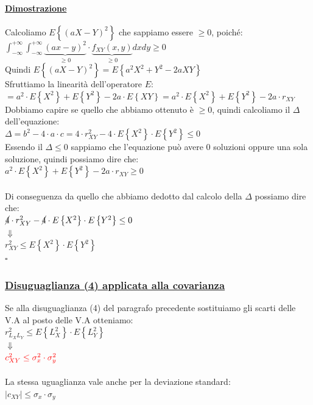 \documentclass{article}
\begin{document}
\begin{enumerate}
    \paragraph{\underline{Dimostrazione}}
    Calcoliamo $E\left\{ (aX - Y)^2 \right\}$ che sappiamo essere $\geq 0$, poiché: \\
    $\int_{-\infty}^{+\infty} \int_{-\infty}^{+\infty} \underset{\geq 0}{\underbrace{(ax-y)^2}} \cdot \underset{\geq 0}{\underbrace{f_{XY}(x,y)}} dx dy \geq 0$ \\
    Quindi $E\left\{ (aX - Y)^2 \right\} = E\left\{ a^2X^2 + Y^2 - 2aXY \right\}$ \\
    Sfruttiamo la linearità dell'operatore $E$: \\
    $= a^2 \cdot E\left\{ X^2 \right\} + E\left\{ Y^2 \right\} - 2a \cdot E\left\{ XY \right\} = a^2 \cdot E\left\{ X^2 \right\} + E\left\{ Y^2 \right\} - 2a \cdot r_{XY}$ \\
    Dobbiamo capire se quello che abbiamo ottenuto è $\geq 0$, quindi calcoliamo il $\Delta$ dell'equazione: \\
    $\Delta = b^2-4 \cdot a \cdot c = 4 \cdot r^2_{XY} - 4 \cdot E \left\{ X^2 \right\} \cdot E \left\{ Y^2 \right\} \leq 0$ \\
    Essendo il $\Delta \leq 0$ sappiamo che l'equazione può avere 0 soluzioni oppure una sola soluzione, quindi possiamo dire che: \\
    $a^2 \cdot E\left\{ X^2 \right\} + E\left\{ Y^2 \right\} - 2a \cdot r_{XY} \geq 0$ \\ \\
    Di conseguenza da quello che abbiamo dedotto dal calcolo della $\Delta$ possiamo dire che: \\
    $\cancel{4} \cdot r^2_{XY} - \cancel{4} \cdot E \left\{ X^2 \right\} \cdot E \left\{ Y^2 \right\} \leq 0$ \\
    $\Downarrow$ \\
    $r^2_{XY} \leq E \left\{ X^2 \right\} \cdot E \left\{ Y^2 \right\}$ \\
    \hspace*{0pt}\hfill $\square$
\end{enumerate}
\subsubsection{\underline{Disuguaglianza (4) applicata alla covarianza}}
Se alla disuguaglianza (4) del paragrafo precedente sostituiamo gli scarti delle V.A al posto delle V.A otteniamo: \\
$r^2_{L_X L_Y} \leq E\left\{ L_X^2 \right\} \cdot E\left\{ L_Y^2 \right\}$ \\
$\Downarrow$ \\
$\color{red} c^2_{XY} \leq \sigma_x^2 \cdot \sigma_y^2$ \\ \\
La stessa uguaglianza vale anche per la deviazione standard: \\
$|c_{XY}| \leq \sigma_x \cdot \sigma_y$
\end{document}
